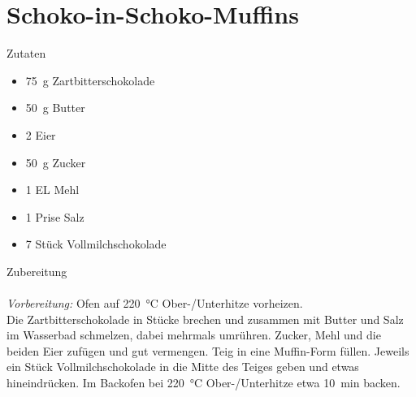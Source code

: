 \section*{Schoko-in-Schoko-Muffins}
\ihead{}\ohead{}
\cfoot{}
{\Large Zutaten}
\begin{multicols}{2}
\begin{itemize}
    \item \SI{75}{g} Zartbitterschokolade
    \item \SI{50}{g} Butter
    \item \num{2} Eier
    \item \SI{50}{g} Zucker
    \item \num{1} EL Mehl
    \item \num{1} Prise Salz
    \item \num{7} Stück Vollmilchschokolade
\end{itemize}
\end{multicols}
\noindent
{\Large Zubereitung}\\
\\
\textit{Vorbereitung:} Ofen auf \SI{220}{\celsius} Ober-/Unterhitze vorheizen.\\
Die Zartbitterschokolade in Stücke brechen und zusammen mit Butter und Salz im Wasserbad schmelzen, dabei mehrmals umrühren.
Zucker, Mehl und die beiden Eier zufügen und gut vermengen.
Teig in eine Muffin-Form füllen. 
Jeweils ein Stück Vollmilchschokolade in die Mitte des Teiges geben und etwas hineindrücken.
Im Backofen bei \SI{220}{\celsius} Ober-/Unterhitze etwa \SI{10}{min} backen.